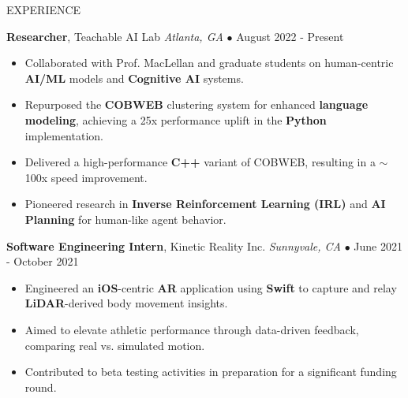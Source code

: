 \documentclass{resume} %
\begin{document}
\begin{rSection}{EXPERIENCE}
\vspace{-1mm}

\textbf{Researcher}, Teachable AI Lab \hfill \textit{Atlanta, GA} $\bullet$ August 2022 - Present
\vspace{-2mm}
\begin{itemize}
\itemsep -6pt {}
\item Collaborated with Prof. MacLellan and graduate students on human-centric \textbf{AI/ML} models and \textbf{Cognitive AI} systems.
\item Repurposed the \textbf{COBWEB} clustering system for enhanced \textbf{language modeling}, achieving a 25x performance uplift in the \textbf{Python} implementation.
\item Delivered a high-performance \textbf{C++} variant of COBWEB, resulting in a \(\sim \)100x speed improvement.
\item Pioneered research in \textbf{Inverse Reinforcement Learning (IRL)} and \textbf{AI Planning} for human-like agent behavior.\end{itemize}

\vspace{-1mm}

\textbf{Software Engineering Intern}, Kinetic Reality Inc. \hfill \textit{Sunnyvale, CA} $\bullet$ June 2021 - October 2021
\vspace{-2mm}
\begin{itemize}
\itemsep -6pt {}
\item Engineered an \textbf{iOS}-centric \textbf{AR} application using \textbf{Swift} to capture and relay \textbf{LiDAR}-derived body movement insights.
\item Aimed to elevate athletic performance through data-driven feedback, comparing real vs. simulated motion.
\item Contributed to beta testing activities in preparation for a significant funding round.\end{itemize}

\end{rSection}


\end{document}
